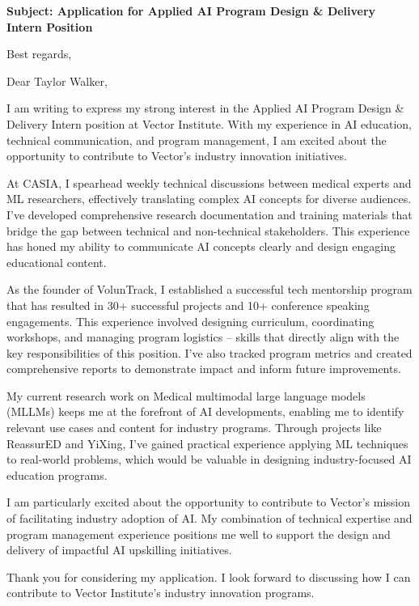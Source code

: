 \documentclass[11pt,a4paper,roman]{moderncv}
\begin{document}
\date{\today}
\opening{\textbf{Subject: Application for Applied AI Program Design \& Delivery Intern Position}}
\closing{Best regards,}

\makelettertitle

Dear Taylor Walker,

I am writing to express my strong interest in the Applied AI Program Design \& Delivery Intern position at Vector Institute. With my experience in AI education, technical communication, and program management, I am excited about the opportunity to contribute to Vector's industry innovation initiatives.

At CASIA, I spearhead weekly technical discussions between medical experts and ML researchers, effectively translating complex AI concepts for diverse audiences. I've developed comprehensive research documentation and training materials that bridge the gap between technical and non-technical stakeholders. This experience has honed my ability to communicate AI concepts clearly and design engaging educational content.

As the founder of VolunTrack, I established a successful tech mentorship program that has resulted in 30+ successful projects and 10+ conference speaking engagements. This experience involved designing curriculum, coordinating workshops, and managing program logistics – skills that directly align with the key responsibilities of this position. I've also tracked program metrics and created comprehensive reports to demonstrate impact and inform future improvements.

My current research work on Medical multimodal large language models (MLLMs) keeps me at the forefront of AI developments, enabling me to identify relevant use cases and content for industry programs. Through projects like ReassurED and YiXing, I've gained practical experience applying ML techniques to real-world problems, which would be valuable in designing industry-focused AI education programs.

I am particularly excited about the opportunity to contribute to Vector's mission of facilitating industry adoption of AI. My combination of technical expertise and program management experience positions me well to support the design and delivery of impactful AI upskilling initiatives.

Thank you for considering my application. I look forward to discussing how I can contribute to Vector Institute's industry innovation programs.

\makeletterclosing
\end{document}
